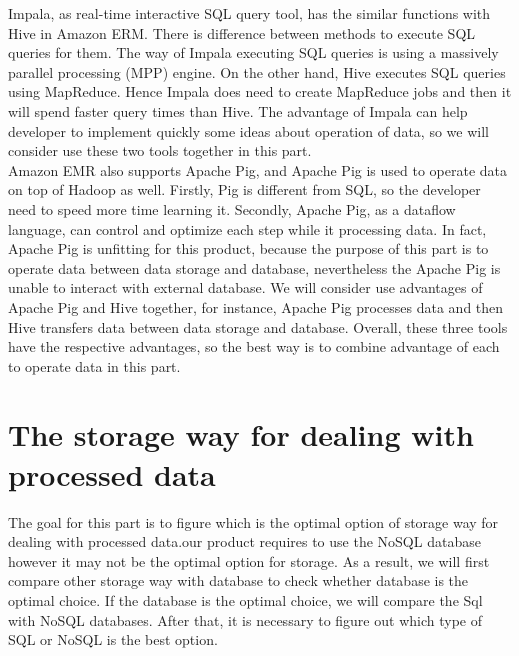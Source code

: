 \documentclass[10pt,draftclsnofoot,onecolumn,journal,compsoc]{IEEEtran}
\begin{document}
        \noindent Impala, as real-time interactive SQL query tool, has the similar functions with Hive in Amazon ERM. There is difference between methods to execute SQL queries for them. The way of Impala executing SQL queries is using a massively parallel processing (MPP) engine. On the other hand, Hive executes SQL queries using MapReduce. Hence Impala does need to create MapReduce jobs and then it will spend faster query times than Hive\cite{Z8}. The advantage of Impala can help developer to implement quickly some ideas about operation of data, so we will consider use these two tools together in this part.\\
        
        \noindent Amazon EMR also supports Apache Pig, and Apache Pig is used to operate data on top of Hadoop as well. Firstly, Pig is different from SQL, so the developer need to speed more time learning it. Secondly, Apache Pig, as a dataflow language, can control and optimize each step while it processing data. In fact, Apache Pig is unfitting for this product, because the purpose of this part is to operate data between data storage and database, nevertheless the Apache Pig is unable to interact with external database. We will consider use advantages of Apache Pig and Hive together, for instance, Apache Pig processes data and then Hive transfers data between data storage and database. Overall, these three tools have the respective advantages, so the best way is to combine advantage of each to operate data in this part.

        \section{The storage way for dealing with processed data}
        The goal for this part is to figure which is the optimal option of storage way for dealing with  processed data.our product requires to use the NoSQL database however it may not be the optimal option for storage. As a result, we will first compare other storage way with database to check whether database is the optimal choice. If the database is the optimal choice, we will compare the Sql with NoSQL databases. After that, it is necessary to figure out which type of SQL or NoSQL is the best option.\\
    
\end{document}
